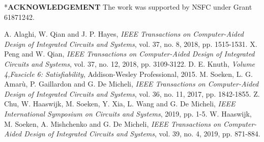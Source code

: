 \documentclass[conference,letterpaper]{IEEEtran}
\makeatletter
\renewcommand{\section}{\@startsection{section}{1}{0mm}
    {-\baselineskip}{0.001\baselineskip}{\bf\leftline}}
\makeatother
\begin{document}
\section*{\textbf{\large ACKNOWLEDGEMENT}} \vspace{-0ex}
The work was supported by NSFC under Grant 61871242.

\footnotesize
\begin{thebibliography}{10}
A. Alaghi, W. Qian and J. P. Hayes, \emph{IEEE Transactions on Computer-Aided Design of Integrated Circuits and Systems}, vol. 37, no. 8, 2018, pp. 1515-1531.
X. Peng and W. Qian, \emph{IEEE Transactions on Computer-Aided Design of Integrated Circuits and Systems}, vol. 37, no. 12, 2018, pp. 3109-3122.
D. E. Knuth, \emph{Volume 4,Fascicle 6: Satisfiability}, Addison-Wesley Professional, 2015.
M. Soeken, L. G. Amarù, P. Gaillardon and G. De Micheli, \emph{IEEE Transactions on Computer-Aided Design of Integrated Circuits and Systems}, vol. 36, no. 11, 2017, pp. 1842-1855.
Z. Chu, W. Haaswijk, M. Soeken, Y. Xia, L. Wang and G. De Micheli, \emph{IEEE International Symposium on Circuits and Systems}, 2019, pp. 1-5.
W. Haaswijk, M. Soeken, A. Mishchenko and G. De Micheli, \emph{IEEE Transactions on Computer-Aided Design of Integrated Circuits and Systems}, vol. 39, no. 4, 2019, pp. 871-884.
\end{thebibliography}

%
\end{document}
